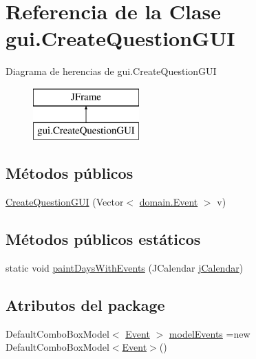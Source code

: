 \hypertarget{classgui_1_1CreateQuestionGUI}{}\section{Referencia de la Clase gui.\+Create\+Question\+G\+UI}
\label{classgui_1_1CreateQuestionGUI}
Diagrama de herencias de gui.\+Create\+Question\+G\+UI\begin{figure}[H]
\begin{center}
\leavevmode
\includegraphics[height=2.000000cm]{classgui_1_1CreateQuestionGUI}
\end{center}
\end{figure}
\subsection*{Métodos públicos}
\begin{DoxyCompactItemize}
\item 
\mbox{\hyperlink{classgui_1_1CreateQuestionGUI_aebd0e09c3e2f3ee4bc383d99124171d1}{Create\+Question\+G\+UI}} (Vector$<$ \mbox{\hyperlink{classdomain_1_1Event}{domain.\+Event}} $>$ v)
\end{DoxyCompactItemize}
\subsection*{Métodos públicos estáticos}
\begin{DoxyCompactItemize}
\item 
static void \mbox{\hyperlink{classgui_1_1CreateQuestionGUI_a31ee6b80a30b5fb2fae4347a754f9246}{paint\+Days\+With\+Events}} (J\+Calendar \mbox{\hyperlink{classgui_1_1CreateQuestionGUI_a8f04ad9ee4441b9a1bd2f8aedcddeadb}{j\+Calendar}})
\end{DoxyCompactItemize}
\subsection*{Atributos del \textquotesingle{}package\textquotesingle{}}
\begin{DoxyCompactItemize}
\item 
Default\+Combo\+Box\+Model$<$ \mbox{\hyperlink{classdomain_1_1Event}{Event}} $>$ \mbox{\hyperlink{classgui_1_1CreateQuestionGUI_a95eda1d4dff395e54c15f08cc579f613}{model\+Events}} =new Default\+Combo\+Box\+Model$<$\mbox{\hyperlink{classdomain_1_1Event}{Event}}$>$()
\end{DoxyCompactItemize}
